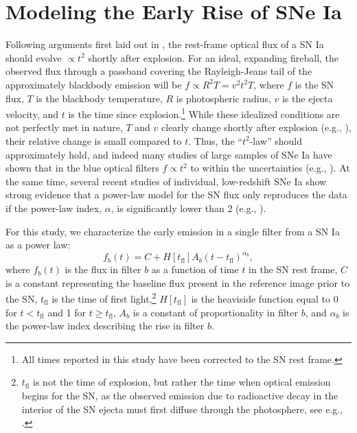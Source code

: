 \documentclass[twocolumn]{./aastex63}
\begin{document}
\section{Modeling the Early Rise of SNe Ia}\label{sec:model}

Following arguments first laid out in \citet{Riess99a}, the rest-frame optical
flux of a SN Ia should evolve $\propto t^2$ shortly after explosion. For an
ideal, expanding fireball, the observed flux through a passband covering the
Rayleigh-Jeans tail of the approximately blackbody emission will be $f \propto
R^2 T = v^2 t^2 T$, where $f$ is the SN flux, $T$ is the blackbody
temperature, $R$ is photospheric radius, $v$ is the ejecta velocity, and $t$
is the time since explosion.\footnote{All times reported in this study have
been corrected to the SN rest frame.} While these idealized conditions are not
perfectly met in nature, $T$ and $v$ clearly change shortly after explosion
(e.g., \citealt{Parrent12}), their relative change is small compared to $t$.
Thus, the ``$t^2$-law'' should approximately hold, and indeed many studies of
large samples of SNe Ia have shown that in the blue optical filters $f \propto
t^2$ to within the uncertainties (e.g., \citealt{Conley06, Hayden10,
Ganeshalingam11}). At the same time, several recent studies of individual,
low-redshift SNe Ia show strong evidence that a power-law model for the SN
flux only reproduces the data if the power-law index, $\alpha$, is
significantly lower than 2 (e.g.,
\citealt{Zheng13,Zheng14,Shappee16,Miller18,Fausnaugh19,Dimitriadis19}).

For this study, we characterize the early emission in a single filter from a
SN Ia as a power law:
%
\begin{equation}
    f_b(t) = C + H[t_\mathrm{fl}] A_b (t - t_\mathrm{fl})^{\alpha_b},
    \label{eqn:flux_model}
\end{equation}
%
where $f_b(t)$ is the flux in filter $b$ as a function of time $t$ in the SN
rest frame, $C$ is a constant representing the baseline flux present in the
reference image prior to the SN, $t_\mathrm{fl}$ is the time of first
light,\footnote{$t_\mathrm{fl}$ is not the time of explosion, but rather the
time when optical emission begins for the SN, as the observed emission due to
radioactive decay in the interior of the SN ejecta must first diffuse through
the photosphere, see e.g., \citet{Piro13,Piro14}.} $H[t_\mathrm{fl}]$ is the
heaviside function equal to 0 for $t < t_\mathrm{fl}$ and 1 for $t \ge
t_\mathrm{fl}$, $A_b$ is a constant of proportionality in filter $b$, and
$\alpha_b$ is the power-law index describing the rise in filter $b$.
\end{document}
